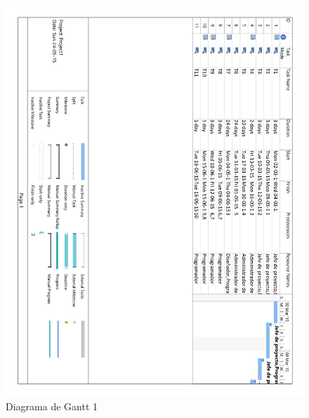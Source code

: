 \begin{figure}[!htp]
	\centering
	\includegraphics[page=1, scale=.7]{fig/real_gantt_diagram}
	\caption{Diagrama de Gantt 1}
\end{figure}

